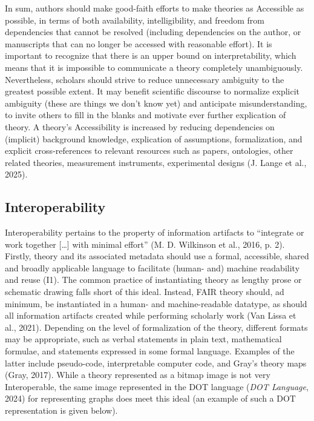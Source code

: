 \documentclass[
  man, noextraspace,floatsintext]{apa7}
\begin{document}
In sum, authors should make good-faith efforts to make theories as Accessible as possible, in terms of both availability, intelligibility, and freedom from dependencies that cannot be resolved (including dependencies on the author, or manuscripts that can no longer be accessed with reasonable effort).
It is important to recognize that there is an upper bound on interpretability, which means that it is impossible to communicate a theory completely unambiguously.
Nevertheless, scholars should strive to reduce unnecessary ambiguity to the greatest possible extent.
It may benefit scientific discourse to normalize explicit ambiguity (these are things we don't know yet) and anticipate misunderstanding,
to invite others to fill in the blanks and motivate ever further explication of theory.
A theory's Accessibility is increased by
reducing dependencies on (implicit) background knowledge,
explication of assumptions,
formalization,
and explicit cross-references to relevant resources such as papers, ontologies, other related theories, measurement instruments, experimental designs (J. Lange et al., 2025).

\subsection{Interoperability}\label{interoperability}

Interoperability pertains to the property of information artifacts to ``integrate or work together {[}\ldots{]} with minimal effort'' (M. D. Wilkinson et al., 2016, p. 2).
Firstly, theory and its associated metadata should use a formal, accessible, shared and broadly applicable language to facilitate (human- and) machine readability and reuse (I1).
The common practice of instantiating theory as lengthy prose or schematic drawing falls short of this ideal.
Instead, FAIR theory should, ad minimum,
be instantiated in a human- and machine-readable datatype,
as should all information artifacts created while performing scholarly work (Van Lissa et al., 2021).
Depending on the level of formalization of the theory,
different formats may be appropriate,
such as verbal statements in plain text,
mathematical formulae,
and statements expressed in some formal language.
Examples of the latter include pseudo-code,
interpretable computer code,
and Gray's theory maps (Gray, 2017).
While a theory represented as a bitmap image is not very Interoperable,
the same image represented in the DOT language (\emph{{DOT Language}}, 2024)
for representing graphs does meet this ideal (an example of such a DOT representation is given below).
\end{document}
